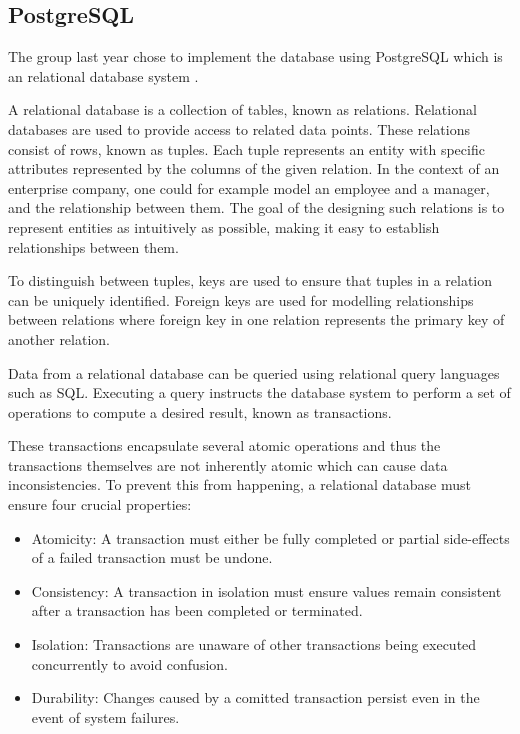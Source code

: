 \subsection{PostgreSQL}
The group last year chose to implement the database using PostgreSQL which is an relational database system .

A relational database is a collection of tables, known as relations. Relational databases are used to provide access to related data points.
These relations consist of rows, known as tuples. Each tuple represents an entity with specific attributes represented by the columns of the given relation.
In the context of an enterprise company, one could for example model an employee and a manager, and the relationship between them.
The goal of the designing such relations is to represent entities as intuitively as possible, making it easy to establish relationships between them. 

To distinguish between tuples, keys are used to ensure that tuples in a relation can be uniquely identified.
Foreign keys are used for modelling relationships between relations where foreign key in one relation represents the primary key of another relation.

Data from a relational database can be queried using relational query languages such as SQL.
Executing a query instructs the database system to perform a set of operations to compute a desired result, known as transactions.

These transactions encapsulate several atomic operations and thus the transactions themselves are not inherently atomic which can cause data inconsistencies. 
To prevent this from happening, a relational database must ensure four crucial properties:
\begin{itemize}
    \item Atomicity: A transaction must either be fully completed or partial side-effects of a failed transaction must be undone.
    \item Consistency: A transaction in isolation must ensure values remain consistent after a transaction has been completed or terminated.
    \item Isolation: Transactions are unaware of other transactions being executed concurrently to avoid confusion.
    \item Durability: Changes caused by a comitted transaction persist even in the event of system failures.
\end{itemize}

